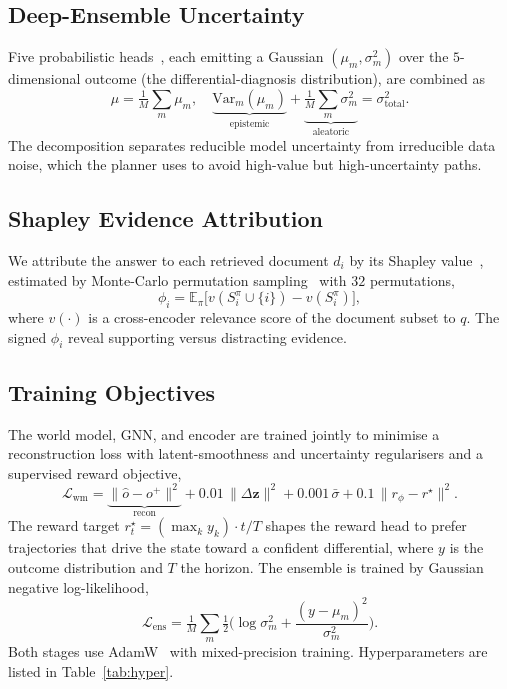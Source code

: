 \documentclass[conference]{IEEEtran}
\begin{document}
\subsection{Deep-Ensemble Uncertainty}
Five probabilistic heads~\cite{lakshminarayanan2017ensembles}, each emitting a
Gaussian $(\mu_m,\sigma_m^2)$ over the $5$-dimensional outcome (the
differential-diagnosis distribution), are combined as
\begin{equation}
\mu=\tfrac{1}{M}\sum_m\mu_m,\quad
\underbrace{\mathrm{Var}_m(\mu_m)}_{\text{epistemic}}+
\underbrace{\tfrac{1}{M}\sum_m\sigma_m^2}_{\text{aleatoric}}=\sigma^2_{\text{total}} .
\end{equation}
The decomposition separates reducible model uncertainty from irreducible data
noise, which the planner uses to avoid high-value but high-uncertainty paths.

\subsection{Shapley Evidence Attribution}
We attribute the answer to each retrieved document $d_i$ by its Shapley
value~\cite{shapley1953value}, estimated by Monte-Carlo permutation
sampling~\cite{lundberg2017shap} with $32$ permutations,
\begin{equation}
\phi_i=\mathbb{E}_{\pi}\big[v(S_i^\pi\cup\{i\})-v(S_i^\pi)\big],
\end{equation}
where $v(\cdot)$ is a cross-encoder relevance score of the document subset to
$q$. The signed $\phi_i$ reveal supporting versus distracting evidence.

\subsection{Training Objectives}
The world model, GNN, and encoder are trained jointly to minimise a
reconstruction loss with latent-smoothness and uncertainty regularisers and a
supervised reward objective,
\begin{equation}
\mathcal{L}_{\text{wm}} = \underbrace{\|\hat{o}-o^+\|^2}_{\text{recon}}
+ 0.01\,\|\Delta\mathbf{z}\|^2
+ 0.001\,\bar{\sigma}
+ 0.1\,\|r_\phi-r^\star\|^2 .
\end{equation}
The reward target $r^\star_t = (\max_k y_k)\cdot t/T$ shapes the reward head to
prefer trajectories that drive the state toward a confident differential, where
$y$ is the outcome distribution and $T$ the horizon. The ensemble is trained by
Gaussian negative log-likelihood,
\begin{equation}
\mathcal{L}_{\text{ens}}=\tfrac{1}{M}\sum_m\tfrac{1}{2}
\Big(\log\sigma_m^2+\frac{(y-\mu_m)^2}{\sigma_m^2}\Big).
\end{equation}
Both stages use AdamW~\cite{kingma2015adam} with mixed-precision training.
Hyperparameters are listed in Table~\ref{tab:hyper}.
\end{document}
